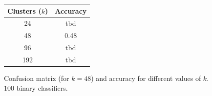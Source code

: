 \documentclass[12pt]{article}
\begin{document}
  \begin{figure}[H]
    \centering
    \caption*{Confusion matrix (for \( k = 48 \)) and accuracy for different values of \( k \). \( 100 \) binary classifiers.}
    \quad\quad\quad
    \begin{tabular}[b]{cc}
			\toprule
      Clusters (\( k \)) & Accuracy \\
      \midrule
      24  & tbd \\
      48  & 0.48 \\
      96  & tbd \\
      192 & tbd \\
      \bottomrule
    \end{tabular}
  \end{figure}




\renewcommand*{\refname}{References}
\printbibliography
\end{document}
